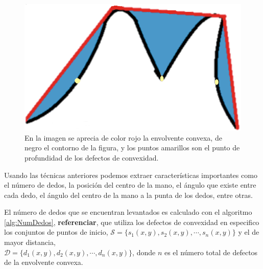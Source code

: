 \begin{figure}[h!]
\begin{center}
\includegraphics[scale=.4]{./Figures/ConvexHullAndDefects.png}
\end{center}
\caption{En la imagen se aprecia de color rojo la envolvente convexa, de negro el contorno de la figura, y los puntos amarillos son el punto de profundidad de los defectos de convexidad.}
\label{fig:FigConvexHullDefects}
\end{figure}  

Usando las técnicas anteriores podemos extraer características importantes como el número de dedos, la posición del centro de la mano, el ángulo que existe entre cada dedo, el ángulo del centro de la mano a la punta de los dedos, entre otras. 

El número de dedos que se encuentran levantados es calculado con el algoritmo \ref{alg:NumDedos}, \textbf{referenciar}, que utiliza los defectos de convexidad en especifico los conjuntos de puntos de inicio, $\mathcal{S}=\lbrace s_1(x,y), s_2(x,y), \cdots, s_n(x,y) \rbrace$ y el de mayor distancia, \\ 
$\mathcal{D}=\lbrace d_1(x,y), d_2(x,y), \cdots, d_n(x,y) \rbrace$, donde $n$ es el número total de defectos de la envolvente convexa.  

\begin{algorithm}[h!]
\begin{algorithmic}[1]
\REQUIRE Los conjuntos $\mathcal{S}$, $\mathcal{D}$.   
\ENSURE Número de dedos, $Nf$.  

	\STATE $minDist=20$, $maxAng=60$, $antecesor=0$, $sucesor=0$. 	
	
	\STATE \textbf{continuar} 
	\ENDIF 
	
	\STATE $antecesor=n-1$,
	\ELSE
	\STATE $antecesor=i-1$,
	\ENDIF 

	\STATE $sucesor=0$,
	\ELSE
	\STATE $sucesor=i+1$,
	\ENDIF   
	
	\STATE Calcular el ángulo entre $s_{antecesor}(x,y)$, $d_i}$  $s_{sucesor}(x,y)$.
	
	\IF{$ \text{ángulo} \geqslant maxAng$}
	\STATE \textbf{continuar}
	\ENDIF  
	
	\STATE $Nf=Nf+1$.
\ENDFOR 

\caption{Calcula el número de dedos de la mano.}
\label{alg:NumDedos} 
\end{algorithmic}
\end{algorithm} 

